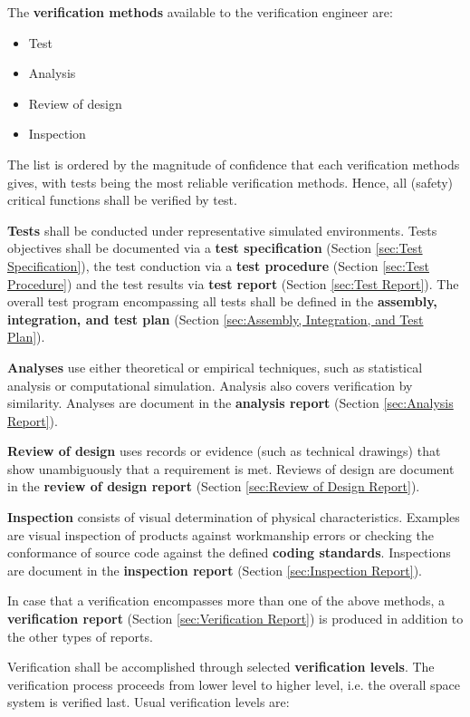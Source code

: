 The \textbf{verification methods} available to the verification engineer are:

\begin{itemize}
\item Test
\item Analysis
\item Review of design
\item Inspection
\end{itemize}

The list is ordered by the magnitude of confidence that each verification methods gives, with tests being the most reliable verification methods. Hence, all (safety) critical functions shall be verified by test.

\textbf{Tests} shall be conducted under representative simulated environments. Tests objectives shall be documented via a \textbf{test specification} (Section \ref{sec:Test Specification}), the test conduction via a \textbf{test procedure} (Section \ref{sec:Test Procedure}) and the test results via \textbf{test report} (Section \ref{sec:Test Report}). The overall test program encompassing all tests shall be defined in the \textbf{assembly, integration, and test plan} (Section \ref{sec:Assembly, Integration, and Test Plan}).

\textbf{Analyses} use either theoretical or empirical techniques, such as statistical analysis or computational simulation. Analysis also covers verification by similarity. Analyses are document in the \textbf{analysis report} (Section \ref{sec:Analysis Report}).

\textbf{Review of design} uses records or evidence (such as technical drawings) that show unambiguously that a requirement is met. Reviews of design are document in the \textbf{review of design report} (Section \ref{sec:Review of Design Report}).

\textbf{Inspection} consists of visual determination of physical characteristics. Examples are visual inspection of products against workmanship errors or checking the conformance of source code against the defined \textbf{coding standards}. Inspections are document in the \textbf{inspection report} (Section \ref{sec:Inspection Report}).

In case that a verification encompasses more than one of the above methods, a \textbf{verification report} (Section \ref{sec:Verification Report}) is produced in addition to the other types of reports.

Verification shall be accomplished through selected \textbf{verification levels}. The verification process proceeds from lower level to higher level, i.e. the overall space system is verified last. Usual verification levels are:

